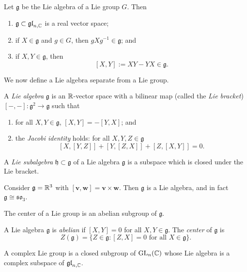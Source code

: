 \begin{proposition}
    Let $\mathfrak g$ be the Lie algebra of a Lie group $G$. Then
    \begin{enumerate}
        \item $\mathfrak g \subset \gl[n, \C]$ is a real vector space;
        \item if $X \in \mathfrak g$ and $g \in G$, then $g X g^{-1} \in \mathfrak g$; and
        \item if $X, Y \in \mathfrak g$, then
              \[ [X,Y] := XY - YX \in \mathfrak g. \]
    \end{enumerate}
\end{proposition}

We now define a Lie algebra separate from a Lie group.

\begin{definition}
    A \emph{Lie algebra} $\mathfrak g$ is an $\R$-vector space with a bilinear map (called the \emph{Lie bracket}) $[-,-]: \mathfrak g^2 \to \mathfrak g$ such that
    \begin{enumerate}
        \item for all $X, Y \in \mathfrak g$, $[X,Y] = -[Y,X]$; and
        \item the \emph{Jacobi identity} holds: for all $X, Y, Z \in \mathfrak g$
              \[ [X, [Y,Z]] + [Y, [Z, X]] + [Z, [X,Y]] = 0. \]
    \end{enumerate}
\end{definition}

A \emph{Lie subalgebra} $\mathfrak h \subset \mathfrak g$ of a Lie algebra $\mathfrak g$ is a subspace which is closed under the Lie bracket.

\begin{example}
    Consider $\mathfrak g = \R^3$ with $[\bm v, \bm w] = \bm v \times \bm w$. Then $\mathfrak g$ is a Lie algebra, and in fact $\mathfrak g \cong \mathfrak{so}_3$.
\end{example}

The center of a Lie group is an abelian subgroup of $\mathfrak g$.

\begin{definition}
    A Lie algebra $\mathfrak g$ is \emph{abelian} if $[X,Y] = 0$ for all $X, Y \in \mathfrak g$. The \emph{center} of $\mathfrak g$ is
    \[ Z(\mathfrak g) = \{Z \in \mathfrak g: \text{$[Z,X] = 0$ for all $X \in \mathfrak g$}\}. \]
\end{definition}

\begin{definition}
    A complex Lie group is a closed subgroup of $\GL_n(\C)$ whose Lie algebra is a complex subspace of $\gl[n, \C]$.
\end{definition}

